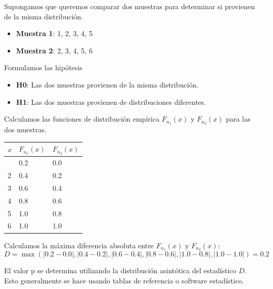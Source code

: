 \documentclass[
  letterpaper,
  DIV=11,
  numbers=noendperiod]{scrreprt}
\providecommand{\tightlist}{%
  \setlength{\itemsep}{0pt}\setlength{\parskip}{0pt}}\usepackage{longtable,booktabs,array}
\begin{document}
\begin{tcolorbox}[enhanced jigsaw, arc=.35mm, breakable, coltitle=black, left=2mm, opacityback=0, bottomtitle=1mm, colbacktitle=quarto-callout-tip-color!10!white, title=\textcolor{quarto-callout-tip-color}{\faLightbulb}\hspace{0.5em}{Ejemplo Práctico. Prueba K-S}, titlerule=0mm, colback=white, colframe=quarto-callout-tip-color-frame, bottomrule=.15mm, rightrule=.15mm, opacitybacktitle=0.6, toptitle=1mm, toprule=.15mm, leftrule=.75mm]

Supongamos que queremos comparar dos muestras para determinar si
provienen de la misma distribución.

\begin{itemize}
\tightlist
\item
  \textbf{Muestra 1}: 1, 2, 3, 4, 5
\item
  \textbf{Muestra 2}: 2, 3, 4, 5, 6
\end{itemize}

Formulamos las hipótesis

\begin{itemize}
\tightlist
\item
  \textbf{H0}: Las dos muestras provienen de la misma distribución.
\item
  \textbf{H1}: Las dos muestras provienen de distribuciones diferentes.
\end{itemize}

Calculamos las funciones de distribución empírica \(F_{n_1}(x)\) y
\(F_{n_2}(x)\) para las dos muestras.

\begin{longtable}[]{@{}lll@{}}
\toprule\noalign{}
\(x\) & \(F_{n_1}(x)\) & \(F_{n_2}(x)\) \\
\midrule\noalign{}
\endhead
\bottomrule\noalign{}
\endlastfoot
1 & 0.2 & 0.0 \\
2 & 0.4 & 0.2 \\
3 & 0.6 & 0.4 \\
4 & 0.8 & 0.6 \\
5 & 1.0 & 0.8 \\
6 & 1.0 & 1.0 \\
\end{longtable}

Calculamos la máxima diferencia absoluta entre \(F_{n_1}(x)\) y
\(F_{n_2}(x)\): \[
D = \max(|0.2 - 0.0|, |0.4 - 0.2|, |0.6 - 0.4|, |0.8 - 0.6|, |1.0 - 0.8|, |1.0 - 1.0|) = 0.2
\]

El valor p se determina utilizando la distribución asintótica del
estadístico \(D\). Esto generalmente se hace usando tablas de referencia
o software estadístico.


\end{tcolorbox}
\end{document}
